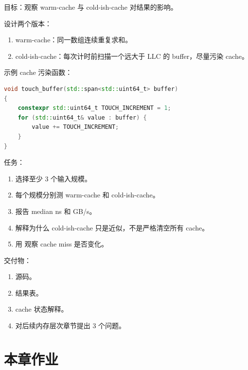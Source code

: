 \begin{labbox}
目标：观察 warm-cache 与 cold-ish-cache 对结果的影响。

设计两个版本：

\begin{enumerate}
  \item warm-cache：同一数组连续重复求和。
  \item cold-ish-cache：每次计时前扫描一个远大于 LLC 的 buffer，尽量污染 cache。
\end{enumerate}

示例 cache 污染函数：

\begin{lstlisting}[language=C++]
void touch_buffer(std::span<std::uint64_t> buffer)
{
    constexpr std::uint64_t TOUCH_INCREMENT = 1;
    for (std::uint64_t& value : buffer) {
        value += TOUCH_INCREMENT;
    }
}
\end{lstlisting}

任务：

\begin{enumerate}
  \item 选择至少 3 个输入规模。
  \item 每个规模分别测 warm-cache 和 cold-ish-cache。
  \item 报告 median ns 和 GB/s。
  \item 解释为什么 cold-ish-cache 只是近似，不是严格清空所有 cache。
  \item 用  观察 cache miss 是否变化。
\end{enumerate}

交付物：

\begin{enumerate}
  \item 源码。
  \item 结果表。
  \item cache 状态解释。
  \item 对后续内存层次章节提出 3 个问题。
\end{enumerate}
\end{labbox}

\section{本章作业}

